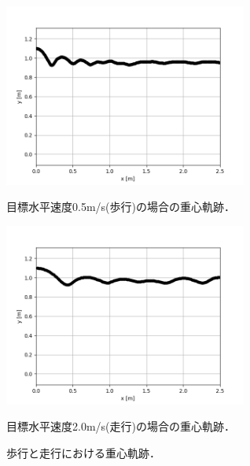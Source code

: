 \begin{figure}[htbp]
 \begin{minipage}[b]{.5\linewidth}
 \centering
 \includegraphics[width = 8cm, clip]{./fig/trj_x2_5_dx1.png}
 \caption{目標水平速度0.5m/s(歩行)の場合の重心軌跡．\label{trjdx05}}
 \end{minipage}
 \begin{minipage}[b]{.5\linewidth}
 \centering
 \includegraphics[width = 8cm,clip]{./fig/trj_x2_5_dx2.png}
 \caption{目標水平速度2.0m/s(走行)の場合の重心軌跡．\label{trjdx20}}    \end{minipage}
\caption{歩行と走行における重心軌跡．\label{trj}}
\end{figure}



